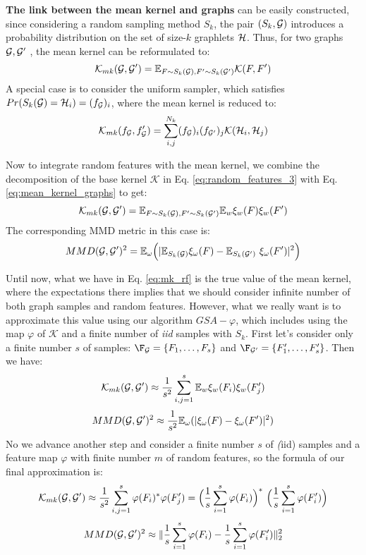 \textbf{The link between the mean kernel and graphs} can be easily constructed, since considering a random sampling method $S_k$, the pair $(S_k , \mathcal{G})$  introduces a probability distribution on the set of size-$k$ graphlets $\mathcal{H}$. Thus, for two graphs $\mathcal{G},\mathcal{G}'$ , the mean kernel can be reformulated to:
\begin{equation}
\label{eq:mean_kernel_graphs}
\mathcal{K}_{mk}(\mathcal{G},\mathcal{G}')= \mathbb{E}_{F \sim S_k(\mathcal{G}), F' \sim S_k(\mathcal{G}')} \mathcal{K}(F,F')
\end{equation}
A special case is to  consider the uniform sampler, which satisfies $Pr(S_k(\mathcal{G})=\mathcal{H}_i)=(f_{\mathcal{G}})_i$, where the mean kernel is reduced to:
\[
\mathcal{K}_{mk}(f_{\mathcal{G}},f_{\mathcal{G}}')=\sum_{i,j}^{N_k}(f_{\mathcal{G}})_i(f_{\mathcal{G}'})_j\mathcal{K}(\mathcal{H}_i,\mathcal{H}_j) 
\]

Now to integrate random features with the mean kernel, we combine the decomposition of the base kernel $\mathcal{K}$ in Eq. \ref{eq:random_features_3} with Eq.\ref{eq:mean_kernel_graphs} to get:
\begin{equation}
    \label{eq:mk_rf}
    \mathcal{K}_{mk}(\mathcal{G},\mathcal{G}')= \mathbb{E}_{F \sim S_k(\mathcal{G}), F' \sim S_k(\mathcal{G}')} \mathbb{E}_w \xi_w(F)\xi_w(F')
\end{equation}
The corresponding MMD metric in this case is:
\begin{equation}
\label{eq:MMD-RF}
MMD(\mathcal{G},\mathcal{G}')^2 = \mathbb{E}_{\omega} \Big( | \mathbb{E}_{S_k(\mathcal{G})} \xi_\omega(F) - \mathbb{E}_{S_k(\mathcal{G}')} \
\xi_\omega(F') |^2 \Big)
\end{equation}

Until now, what we have in Eq. \ref{eq:mk_rf} is the true value of the mean kernel, where the expectations there implies that we should consider infinite number of both graph samples and random features. However, what we really want is to approximate this value using our algorithm $GSA-\varphi$, which includes  using the  map $\varphi$ of $\mathcal{K}$ and a finite number of \emph{iid} samples with $S_k$. First let's consider only a finite number $s$ of samples: $\F_\G=\{F_1, \ldots, F_s\}$ and $\F_{\G'}=\{F'_1, \ldots, F'_s\}$. Then we have: 
\begin{equation}
\label{eq:MK_samples}
\mathcal{K}_{mk}(\mathcal{G},\mathcal{G}') \approx \frac{1}{s^2} \sum_{i,j=1}^s \mathbb{E}_w \xi_w(F_i)\xi_w(F'_j)
\end{equation}
\[
MMD(\mathcal{G},\mathcal{G}')^2 \approx \frac{1}{s^2}\mathbb{E}_{\omega} ( | \xi_\omega(F) -\xi_\omega(F') |^2 )
\]
No we advance another step and consider a finite number $s$ of \emph(iid) samples and a feature map $\varphi$ with finite number $m$ of random features, so the formula of our final approximation is:
\begin{equation}
\label{eq:mean_kernel_RF}
\mathcal{K}_{mk}(\mathcal{G},\mathcal{G}') \approx \frac{1}{s^2} \sum_{i,j=1}^s \varphi(F_i)^*\varphi(F_j')=\Big(\frac{1}{s}\sum_{i=1}^s\varphi(F_i)\Big)^*~\Big(\frac{1}{s}\sum_{i=1}^s\varphi(F_i')\Big)
\end{equation}
\[
MMD(\mathcal{G},\mathcal{G}')^2 \approx  \| \frac{1}{s}\sum_{i=1}^s\varphi(F_i) -\frac{1}{s}\sum_{i=1}^s\varphi(F_i') \|_2^2 
\]


